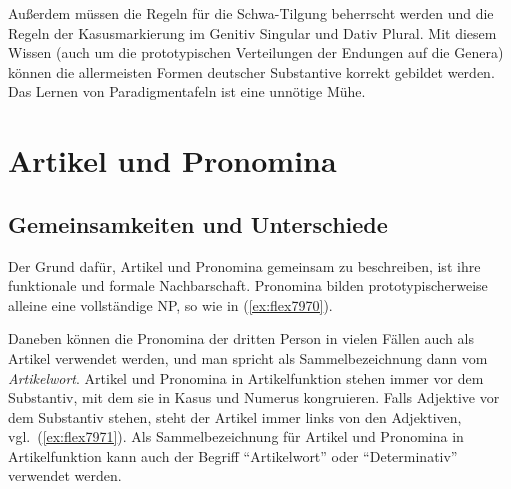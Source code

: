 Außerdem müssen die Regeln für die Schwa-Tilgung beherrscht werden und die Regeln der Kasusmarkierung im Genitiv Singular und Dativ Plural.
Mit diesem Wissen (auch um die prototypischen Verteilungen der Endungen auf die Genera) können die allermeisten Formen deutscher Substantive korrekt gebildet werden.
Das Lernen von Paradigmentafeln ist eine unnötige Mühe.

\section{Artikel und Pronomina}

\label{sec:artikelpronomen}

\subsection{Gemeinsamkeiten und Unterschiede}

Der Grund dafür, Artikel und Pronomina gemeinsam zu beschreiben, ist ihre funktionale und formale Nachbarschaft.
Pronomina bilden prototypischerweise alleine eine vollständige NP, so wie in (\ref{ex:flex7970}).

\begin{exe}
  \ex \label{ex:flex7970}
  \begin{xlist}
  \end{xlist}
\end{exe}

Daneben können die Pronomina der dritten Person in vielen Fällen auch als Artikel verwendet werden, und man spricht als Sammelbezeichnung dann vom \textit{Artikelwort}.
Artikel und Pronomina in Artikelfunktion stehen immer vor dem Substantiv, mit dem sie in Kasus und Numerus kongruieren.
Falls Adjektive vor dem Substantiv stehen, steht der Artikel immer links von den Adjektiven, vgl.\ (\ref{ex:flex7971}).
Als Sammelbezeichnung für Artikel und Pronomina in Artikelfunktion kann auch der Begriff ``Artikelwort'' oder ``Determinativ'' verwendet werden.

\begin{exe}
  \ex \label{ex:flex7971}
  \begin{xlist}
  \end{xlist}
\end{exe}

